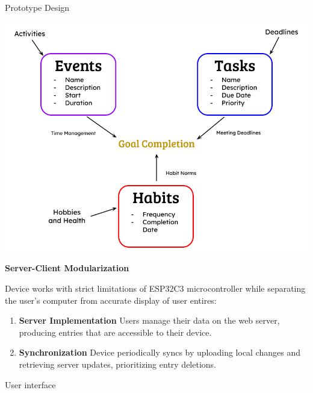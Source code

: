\documentclass[final]{beamer}
\newlength{\colwidth}
\begin{document}
\begin{frame}[t]
\begin{columns}[t]
\begin{column}{\colwidth}
\begin{block}{Prototype Design}
    \begin{center}
      \includegraphics{entry_logic.png}
    \end{center}

    \textbf{Server-Client Modularization}

    Device works with strict limitations of ESP32C3 microcontroller while separating the user's computer from accurate display of user entires:

    \begin{enumerate}
      \item \textbf{Server Implementation} Users manage their data on the web server, producing entries that are accessible to their device.
      \item \textbf{Synchronization} Device periodically syncs by uploading local changes and retrieving server updates, prioritizing entry deletions.
    \end{enumerate}

    \end{block}

    \begin{block}{User interface}


\end{block}
\end{column}
\end{columns}
\end{frame}
\end{document}
